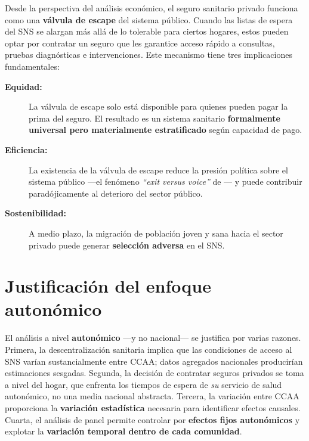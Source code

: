 Desde la perspectiva del análisis económico, el seguro sanitario privado funciona
como una \textbf{válvula de escape} del sistema público. Cuando las listas de
espera del SNS se alargan más allá de lo tolerable para ciertos hogares, estos
pueden optar por contratar un seguro que les garantice acceso rápido a consultas,
pruebas diagnósticas e intervenciones. Este mecanismo tiene tres implicaciones
fundamentales:

\begin{description}
  \item[\textbf{Equidad:}] La válvula de escape solo está disponible para quienes
    pueden pagar la prima del seguro. El resultado es un sistema sanitario
    \textbf{formalmente universal pero materialmente estratificado} según capacidad
    de pago.
  \item[\textbf{Eficiencia:}] La existencia de la válvula de escape reduce la
    presión política sobre el sistema público ---el fenómeno \textit{``exit versus
    voice''} de \textcite{Hirschman1970}--- y puede contribuir paradójicamente al
    deterioro del sector público.
  \item[\textbf{Sostenibilidad:}] A medio plazo, la migración de población joven y
    sana hacia el sector privado puede generar \textbf{selección adversa} en el
    SNS.
\end{description}

\section{Justificación del enfoque autonómico}

El análisis a nivel \textbf{autonómico} ---y no nacional--- se justifica por
varias razones. Primera, la descentralización sanitaria implica que las condiciones
de acceso al SNS varían sustancialmente entre CCAA; datos agregados nacionales
producirían estimaciones sesgadas. Segunda, la decisión de contratar seguros
privados se toma a nivel del hogar, que enfrenta los tiempos de espera de
\textit{su} servicio de salud autonómico, no una media nacional abstracta. Tercera,
la variación entre CCAA proporciona la \textbf{variación estadística} necesaria
para identificar efectos causales. Cuarta, el análisis de panel permite controlar
por \textbf{efectos fijos autonómicos} y explotar la \textbf{variación temporal
dentro de cada comunidad}.

